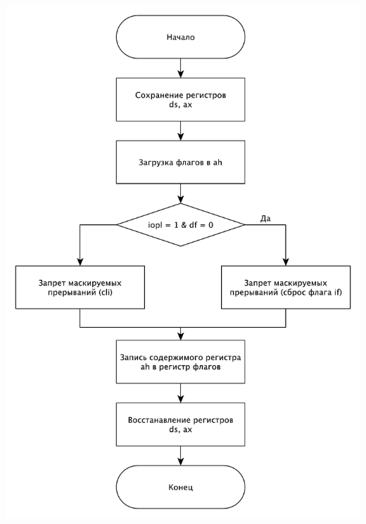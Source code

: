 ﻿\documentclass[a4paper,12pt]{article}
\begin{document}
\begin{center}
    \includegraphics[scale=0.6]{sub}
\end{center}
\end{document}

